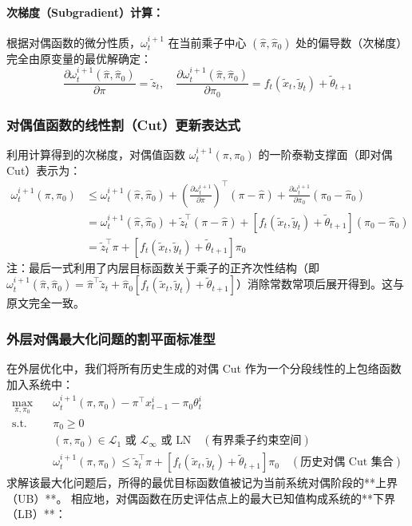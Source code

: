 \documentclass[11pt]{ctexart}
\begin{document}
\paragraph{次梯度（Subgradient）计算：}
根据对偶函数的微分性质，$\omega_t^{i+1}$ 在当前乘子中心 $(\hat{\pi}, \hat{\pi}_0)$ 处的偏导数（次梯度）完全由原变量的最优解确定：
\begin{equation}
\frac{\partial \omega_t^{i+1}(\hat{\pi}, \hat{\pi}_0)}{\partial \pi} = \tilde{z}_t, \quad \frac{\partial \omega_t^{i+1}(\hat{\pi}, \hat{\pi}_0)}{\partial \pi_0} = f_t(\tilde{x}_t, \tilde{y}_t) + \tilde{\theta}_{t+1}
\end{equation}


\subsubsection{ 对偶值函数的线性割（Cut）更新表达式}
利用计算得到的次梯度，对偶值函数 $\omega_t^{i+1}(\pi, \pi_0)$ 的一阶泰勒支撑面（即对偶 Cut）表示为：
\begin{align}
\omega_t^{i+1}(\pi, \pi_0) &\le \omega_t^{i+1}(\hat{\pi}, \hat{\pi}_0) + \left(\frac{\partial \omega_t^{i+1}}{\partial \pi}\right)^\top (\pi - \hat{\pi}) + \frac{\partial \omega_t^{i+1}}{\partial \pi_0} (\pi_0 - \hat{\pi}_0) \nonumber \\
&= \omega_t^{i+1}(\hat{\pi}, \hat{\pi}_0) + \tilde{z}_t^\top (\pi - \hat{\pi}) + [f_t(\tilde{x}_t, \tilde{y}_t) + \tilde{\theta}_{t+1}] (\pi_0 - \hat{\pi}_0) \nonumber \\
&= \tilde{z}_t^\top \pi + [f_t(\tilde{x}_t, \tilde{y}_t) + \tilde{\theta}_{t+1}] \pi_0
\end{align}
注：最后一式利用了内层目标函数关于乘子的正齐次性结构（即 $\omega_t^{i+1}(\hat{\pi}, \hat{\pi}_0) = \hat{\pi}^\top \tilde{z}_t + \hat{\pi}_0 [f_t(\tilde{x}_t, \tilde{y}_t) + \tilde{\theta}_{t+1}]$）消除常数常项后展开得到。这与原文完全一致。

\subsubsection{外层对偶最大化问题的割平面标准型}
在外层优化中，我们将所有历史生成的对偶 Cut 作为一个分段线性的上包络函数加入系统中：
\begin{align}
\max_{\pi, \pi_0} \quad & \omega_t^{i+1}(\pi, \pi_0) - \pi^\top x_{t-1}^i - \pi_0 \theta_t^i \\
\text{s.t.} \quad & \pi_0 \ge 0 \\
& (\pi, \pi_0) \in \mathcal{L}_1 \text{ 或 } \mathcal{L}_\infty \text{ 或 } \text{LN} \quad (\text{有界乘子约束空间}) \\
& \omega_t^{i+1}(\pi, \pi_0) \le \tilde{z}_t^\top \pi + [f_t(\tilde{x}_t, \tilde{y}_t) + \tilde{\theta}_{t+1}] \pi_0 \quad (\text{历史对偶 Cut 集合})
\end{align}
求解该最大化问题后，所得的最优目标函数值被记为当前系统对偶阶段的**上界（UB）**。
相应地，对偶函数在历史评估点上的最大已知值构成系统的**下界（LB）**：
\end{document}
